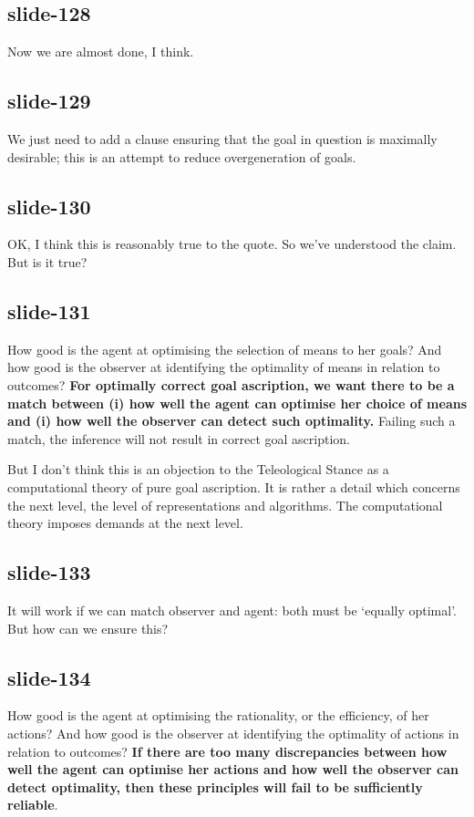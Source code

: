 \documentclass[12pt,\papersize]{extarticle}
\begin{document}
\subsection{slide-128}
Now we are almost done, I think.

\subsection{slide-129}
We just need to add a clause ensuring that the goal in question is maximally
desirable; this is an attempt to reduce overgeneration of goals.

\subsection{slide-130}
OK, I think this is reasonably true to the quote.
So we’ve understood the claim.
But is it true?

\subsection{slide-131}
How good is the agent at optimising the selection of means to her goals?
And how good is the observer at identifying the optimality of means in relation to outcomes?
\textbf{
For optimally correct goal ascription, we want there to be a match between
(i) how well the agent can optimise her choice of means
and
(i) how well the observer can detect such optimality.}
Failing such a match, the inference will not result in correct goal ascription.

But I don’t think this is an objection to the Teleological Stance as a
computational theory of pure goal ascription.  It is rather a detail
which concerns the next level, the level of representations and algorithms.
The computational theory imposes demands at the next level.

\subsection{slide-133}
It will work if we can match observer and agent: both must be ‘equally optimal’.
But how can we ensure this?

\subsection{slide-134}
How good is the agent at optimising the rationality, or the efficiency, of her actions?
And how good is the observer at identifying the optimality of actions in relation to outcomes?
\textbf{
If there are too many discrepancies between
		how well the agent can optimise her actions
	and
		how well the observer can detect optimality,
then these principles will fail to be sufficiently reliable}.
\end{document}
